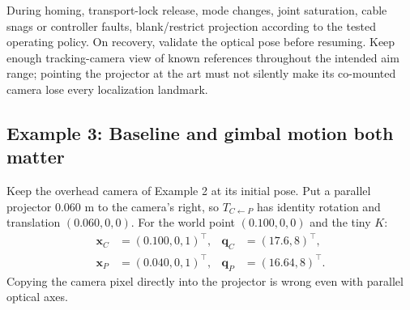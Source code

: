 \documentclass[11pt,a4paper]{article}
\newcommand{\T}[2]{T_{#1\leftarrow #2}}
\newcommand{\pt}[1]{\bm{x}_{#1}}
\begin{document}
During homing, transport-lock release, mode changes, joint saturation,
cable snags or controller faults, blank/restrict projection according to
the tested operating policy. On recovery, validate the optical pose before
resuming. Keep enough tracking-camera view of known references throughout
the intended aim range; pointing the projector at the art must not silently
make its co-mounted camera lose every localization landmark.

\subsection{Example 3: Baseline and gimbal motion both matter}
Keep the overhead camera of Example 2 at its initial pose. Put a parallel
projector 0.060 m to the camera's right, so
$\T{C}{P}$ has identity rotation and translation $(0.060,0,0)$.
For the world point $(0.100,0,0)$ and the tiny $K$:
\begin{align}
\pt{C}&=(0.100,0,1)^\top,& \bm{q}_C&=(17.6,8)^\top,\\
\pt{P}&=(0.040,0,1)^\top,& \bm{q}_P&=(16.64,8)^\top.
\end{align}
Copying the camera pixel directly into the projector is wrong even with
parallel optical axes.
\end{document}
